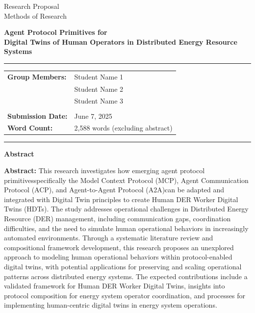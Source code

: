 \documentclass[12pt,a4paper]{article}
\newcommand{\studentone}{Student Name 1}
\newcommand{\studenttwo}{Student Name 2}
\newcommand{\studentthree}{Student Name 3}
\newcommand{\projecttitle}{Agent Protocol Primitives for \\Digital Twins of Human Operators in Distributed Energy Resource Systems}
\newcommand{\submissiondate}{June 7, 2025}
\newcommand{\emdash}{\textemdash}
\begin{document}
\begin{titlepage}
\begin{center}
{\Huge Research Proposal} \\
\vspace{5mm}
{\Large Methods of Research} \\

\vspace{10mm}

{\huge\textbf{\projecttitle}} \\

\vspace{15mm}

\hrule
\vspace{3mm}
\begin{tabular}{ll}
\textbf{Group Members:} & {\studentone} \\
& {\studenttwo} \\
& {\studentthree} \\
\\
\textbf{Submission Date:} & {\submissiondate} \\
\textbf{Word Count:} & 2,588 words (excluding abstract) \\
\end{tabular}
\vspace{3mm}
\hrule

\vspace{15mm}

\textbf{Abstract} \\
\vspace{2mm}
\begin{minipage}{0.8\textwidth}
\textbf{Abstract:} This research investigates how emerging agent protocol primitives\emdash{}specifically the Model Context Protocol (MCP), Agent Communication Protocol (ACP), and Agent-to-Agent Protocol (A2A)\emdash{}can be adapted and integrated with Digital Twin principles to create Human DER Worker Digital Twins (HDTs). The study addresses operational challenges in Distributed Energy Resource (DER) management, including communication gaps, coordination difficulties, and the need to simulate human operational behaviors in increasingly automated environments. Through a systematic literature review and compositional framework development, this research proposes an unexplored approach to modeling human operational behaviors within protocol-enabled digital twins, with potential applications for preserving and scaling operational patterns across distributed energy systems. The expected contributions include a validated framework for Human DER Worker Digital Twins, insights into protocol composition for energy system operator coordination, and processes for implementing human-centric digital twins in energy system operations.
\end{minipage}

\end{center}
\end{titlepage}
\end{document}
